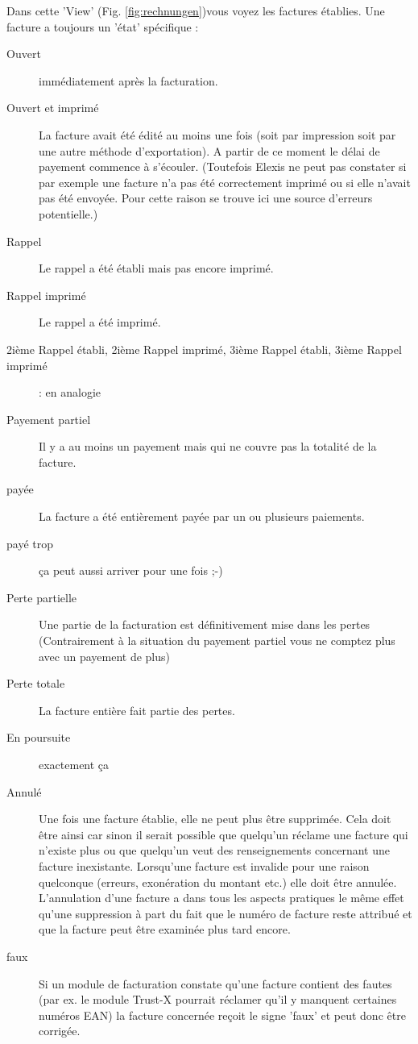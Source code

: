 Dans cette 'View' (Fig. \ref{fig:rechnungen})vous voyez les factures établies. Une facture a toujours un 'état' spécifique :
\begin{description}
    \item [Ouvert] immédiatement après la facturation. 
    \item [Ouvert et imprimé ] La facture avait été édité au moins une fois (soit par impression soit par une autre méthode d'exportation). A partir de ce moment le délai de payement commence à s'écouler. (Toutefois Elexis ne peut pas constater si par exemple une facture n'a pas été correctement imprimé ou si elle n'avait pas été envoyée. Pour cette raison se trouve ici une source d'erreurs potentielle.)
    \item[Rappel] Le rappel a été établi mais pas encore imprimé.
    \item[Rappel imprimé ] Le rappel a été imprimé.
    \item [2ième Rappel établi, 2ième Rappel imprimé, 3ième Rappel établi, 3ième Rappel imprimé ]: en analogie
    \item[Payement partiel ] Il y a au moins un payement mais qui ne couvre pas la totalité de la facture.
    \item[payée] La facture a été entièrement payée par un ou plusieurs paiements.
    \item [payé trop] ça peut aussi arriver pour une fois ;-)
    \item [Perte partielle ] Une partie de la facturation est définitivement mise dans les pertes (Contrairement à la situation du  \glqq payement partiel \grqq{} vous ne comptez plus avec un payement de plus)
    \item [Perte totale] La facture entière fait partie des pertes. 
    \item [En poursuite ] exactement ça
    \item [Annulé ] Une fois une facture établie, elle ne peut plus être supprimée. Cela doit être ainsi car sinon il serait possible que quelqu'un réclame une facture qui n'existe plus ou que quelqu'un veut des renseignements concernant une facture inexistante. Lorsqu'une facture est invalide pour une raison quelconque (erreurs, exonération du montant etc.) elle doit être annulée. L'annulation d'une facture a dans tous les aspects pratiques le même effet qu'une suppression à part du fait que le numéro de facture reste attribué et que la facture peut être examinée plus tard encore.
    \item [faux] Si un module de facturation constate qu'une facture contient des fautes (par ex. le module Trust-X pourrait réclamer qu'il y manquent certaines numéros EAN) la facture concernée reçoit le signe 'faux' et peut donc être corrigée.

\end{description}
